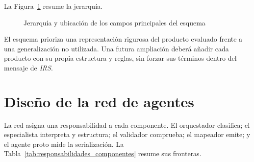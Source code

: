 La Figura~\ref{fig:jerarquia_esquema_irs} resume la jerarquía.

\begin{figure}[H]
    \centering
    \caption[Jerarquía del esquema de IRS]{Jerarquía y ubicación de los campos principales del esquema}
    \label{fig:jerarquia_esquema_irs}
\end{figure}

El esquema prioriza una representación rigurosa del producto evaluado frente a una generalización no utilizada. Una futura ampliación deberá añadir cada producto con su propia estructura y reglas, sin forzar sus términos dentro del mensaje de \textit{IRS}.

\section{Diseño de la red de agentes}
\label{sec:diseno_red_agentes}

La red asigna una responsabilidad a cada componente. El orquestador clasifica; el especialista interpreta y estructura; el validador comprueba; el mapeador emite; y el agente proto mide la serialización. La Tabla~\ref{tab:responsabilidades_componentes} resume sus fronteras.

